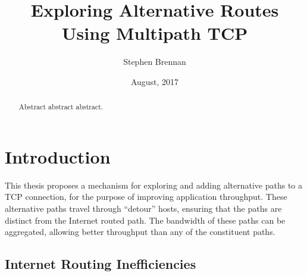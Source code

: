 \documentclass{cwru}
\title{Exploring Alternative Routes Using Multipath TCP}
\author{Stephen Brennan}
\date{August, 2017} %
\begin{document}

%

\maketitle
\makeapprovalsheet

\frontmatter
\tableofcontents

\cleardoublepage
{}
{}
\listoffigures





\acresetall

\begin{abstract}
Abstract abstract abstract.
\end{abstract}

\mainmatter
\chapter{Introduction}

This thesis proposes a mechanism for exploring and adding alternative paths to a
TCP connection, for the purpose of improving application throughput. These
alternative paths travel through ``detour'' hosts, ensuring that the paths are
distinct from the Internet routed path. The bandwidth of these paths can be
aggregated, allowing better throughput than any of the constituent paths.

\section{Internet Routing Inefficiencies}
\end{document}
